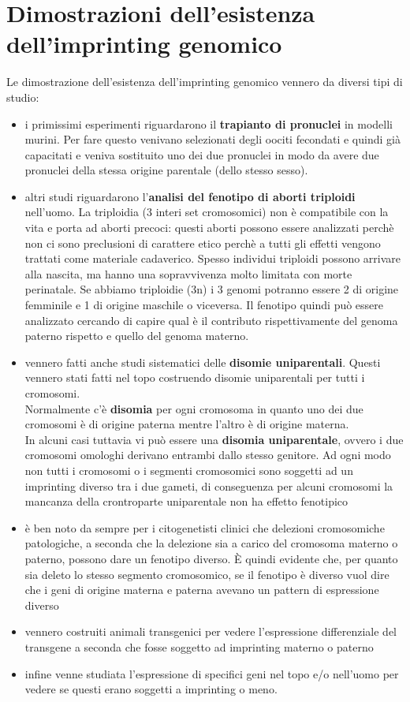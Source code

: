 \documentclass[11pt]{book}
\begin{document}
\section{Dimostrazioni dell'esistenza dell'imprinting genomico}
Le dimostrazione dell'esistenza dell'imprinting genomico vennero da diversi tipi di studio:
\begin{itemize}
\item i primissimi esperimenti riguardarono il \textbf{trapianto di pronuclei} in modelli murini. Per fare questo venivano selezionati degli oociti fecondati e quindi già capacitati e veniva sostituito uno dei due pronuclei in modo da avere due pronuclei della stessa origine parentale (dello stesso sesso).
\item altri studi riguardarono l'\textbf{analisi del fenotipo di aborti triploidi} nell’uomo. La triploidia (3 interi set cromosomici) non è compatibile con la vita e porta ad aborti precoci: questi aborti possono essere analizzati perchè non ci sono preclusioni di carattere etico perchè a tutti gli effetti vengono trattati come materiale cadaverico. Spesso individui triploidi possono arrivare alla nascita, ma hanno una sopravvivenza molto limitata con morte perinatale. Se abbiamo triploidie (3n) i 3 genomi potranno essere 2 di origine femminile e 1 di origine maschile o viceversa. Il fenotipo quindi può essere analizzato cercando di capire qual è il contributo rispettivamente del genoma paterno rispetto e quello del genoma materno.
\item vennero fatti anche studi sistematici delle \textbf{disomie uniparentali}. Questi vennero stati fatti nel topo costruendo disomie uniparentali per tutti i cromosomi.\\
Normalmente c'è \textbf{disomia} per ogni cromosoma in quanto uno dei due cromosomi è di origine paterna mentre l'altro è di origine materna.\\
In alcuni casi tuttavia vi può essere una \textbf{disomia uniparentale}, ovvero i due cromosomi omologhi derivano entrambi dallo stesso genitore.
Ad ogni modo non tutti i cromosomi o i segmenti cromosomici sono soggetti ad un imprinting diverso tra i due gameti, di conseguenza per alcuni cromosomi la mancanza della crontroparte uniparentale non ha effetto fenotipico
\item è ben noto da sempre per i citogenetisti clinici che delezioni cromosomiche patologiche, a seconda che la delezione sia a carico del cromosoma materno o paterno, possono dare un fenotipo diverso. È quindi evidente che, per quanto sia deleto lo stesso segmento cromosomico, se il fenotipo è diverso vuol dire che i geni di origine materna e paterna avevano un pattern di espressione diverso
\item vennero costruiti animali transgenici per vedere l’espressione differenziale del transgene a seconda che fosse soggetto ad imprinting materno o paterno
\item infine venne studiata l’espressione di specifici geni nel topo e/o nell’uomo per vedere se questi erano soggetti a imprinting o meno.
\end{itemize}
\end{document}
